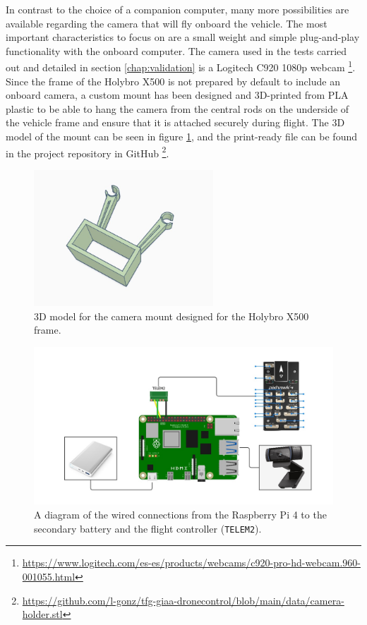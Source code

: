 In contrast to the choice of a companion computer, many more possibilities are available regarding the camera that will fly onboard the vehicle.
The most important characteristics to focus on are a small weight and simple plug-and-play functionality with the onboard computer.
The camera used in the tests carried out and detailed in section \ref{chap:validation} is a Logitech C920 1080p webcam \footnote{\url{https://www.logitech.com/es-es/products/webcams/c920-pro-hd-webcam.960-001055.html}}.
Since the frame of the Holybro X500 is not prepared by default to include an onboard camera, a custom mount has been designed and 3D-printed from PLA plastic to be able to hang the camera from the central rods on the underside of the vehicle frame and ensure that it is attached securely during flight.
The 3D model of the mount can be seen in figure \ref{fig:camera-holder-3d}, and the print-ready file can be found in the project repository in GitHub \footnote{\url{https://github.com/l-gonz/tfg-giaa-dronecontrol/blob/main/data/camera-holder.stl}}.

\begin{figure}
  \centering
  \includegraphics[width=0.6\textwidth, keepaspectratio]{img/cam-holder.jpg}
  \caption{3D model for the camera mount designed for the Holybro X500 frame.}
  \label{fig:camera-holder-3d}
\end{figure}


\begin{figure}
  \centering
  \includegraphics[width=\textwidth,keepaspectratio]{img/wiring-diagram.jpg}
  \caption{A diagram of the wired connections from the Raspberry Pi 4 to the secondary battery and the flight controller (\texttt{TELEM2}).}
  \label{fig:wiring}
\end{figure}


